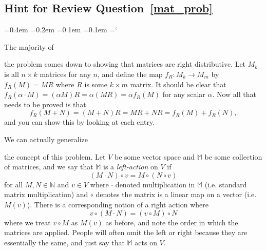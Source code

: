 
\subsection*{Hint for Review Question~\ref{mat_prob}}

{\ttfamily
{}\font=0.4em
\font=0.2em
\font=0.1em
\font=0.1em
\hyphenchar\font=`\-


\hypertarget{scripts_matrices_hint}{The majority of} the problem comes down to showing that matrices are right distributive. Let $M_k$ is all $n \times k$ matrices for any $n$, and define the map $f_R \colon M_k \rightarrow M_m$ by $f_R(M) = MR$ where $R$ is some $k \times m$ matrix. It should be clear that $f_R(\alpha \cdot M) = (\alpha M)R = \alpha (MR) = \alpha f_R(M)$ for any scalar $\alpha$. Now all that needs to be proved is that
\[
f_R(M + N) = (M + N)R = MR + NR = f_R(M) + f_R(N),
\]
and you can show this by looking at each entry.

\hypertarget{action}{We can actually generalize} the concept of this problem. Let $V$ be some vector space and $\mathbb{M}$ be some collection of matrices, and we say that $\mathbb{M}$ is a \emph{left-action} on $V$ if
\[
(M \cdot N) \circ v = M \circ (N \circ v)
\]
for all $M, N \in \mathbb{N}$ and $v \in V$ where $\cdot$ denoted multiplication in $\mathbb{M}$ (i.e. standard matrix multiplication) and $\circ$ denotes the matrix is a linear map on a vector (i.e. $M(v)$). There is a corresponding notion of a right action where
\[
v \circ (M \cdot N) = (v \circ M) \circ N
\]
where we treat $v \circ M$ as $M(v)$ as before, and note the order in which the matrices are applied. People will often omit the left or right because they are essentially the same, and just say that $\mathbb{M}$ acts on $V$.


} %


